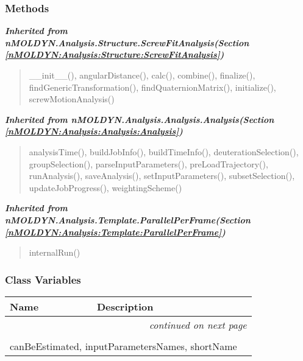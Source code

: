 
  \subsubsection{Methods}


\large{\textbf{\textit{Inherited from nMOLDYN.Analysis.Structure.ScrewFitAnalysis\textit{(Section \ref{nMOLDYN:Analysis:Structure:ScrewFitAnalysis})}}}}

\begin{quote}
\_\_init\_\_(), angularDistance(), calc(), combine(), finalize(), findGenericTransformation(), findQuaternionMatrix(), initialize(), screwMotionAnalysis()
\end{quote}

\large{\textbf{\textit{Inherited from nMOLDYN.Analysis.Analysis.Analysis\textit{(Section \ref{nMOLDYN:Analysis:Analysis:Analysis})}}}}

\begin{quote}
analysisTime(), buildJobInfo(), buildTimeInfo(), deuterationSelection(), groupSelection(), parseInputParameters(), preLoadTrajectory(), runAnalysis(), saveAnalysis(), setInputParameters(), subsetSelection(), updateJobProgress(), weightingScheme()
\end{quote}

\large{\textbf{\textit{Inherited from nMOLDYN.Analysis.Template.ParallelPerFrame\textit{(Section \ref{nMOLDYN:Analysis:Template:ParallelPerFrame})}}}}

\begin{quote}
internalRun()
\end{quote}


  \subsubsection{Class Variables}

    \vspace{-1cm}
\hspace{\varindent}\begin{longtable}{|p{\varnamewidth}|p{\vardescrwidth}|l}
\cline{1-2}
\cline{1-2} \centering \textbf{Name} & \centering \textbf{Description}& \\
\cline{1-2}
\endhead\cline{1-2}\multicolumn{3}{r}{\small\textit{continued on next page}}\\\endfoot\cline{1-2}
\endlastfoot\multicolumn{2}{|l|}{\textit{Inherited from nMOLDYN.Analysis.Structure.ScrewFitAnalysis \textit{(Section \ref{nMOLDYN:Analysis:Structure:ScrewFitAnalysis})}}}\\
\multicolumn{2}{|p{\varwidth}|}{\raggedright canBeEstimated, inputParametersNames, shortName}\\
\cline{1-2}
\end{longtable}

